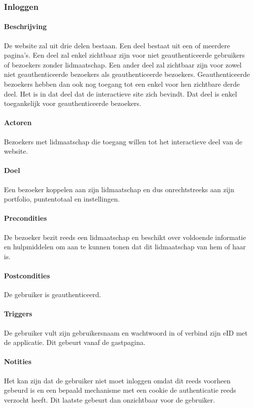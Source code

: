 \subsubsection{Inloggen}
\begin{compact}
\paragraph{Beschrijving} De website zal uit drie delen bestaan. Een deel bestaat uit een of meerdere pagina's. Een deel zal enkel zichtbaar zijn voor niet geauthenticeerde gebruikers of bezoekers zonder lidmaatschap. Een ander deel zal zichtbaar zijn voor zowel niet geauthenticeerde bezoekers als geauthenticeerde bezoekers. Geauthenticeerde bezoekers hebben dan ook nog toegang tot een enkel voor hen zichtbare derde deel. Het is in dat deel dat de interactieve site zich bevindt. Dat deel is enkel toegankelijk voor geauthenticeerde bezoekers.
\paragraph{Actoren} Bezoekers met lidmaatschap die toegang willen tot het interactieve deel van de website.
\paragraph{Doel} Een bezoeker koppelen aan zijn lidmaatschap en dus onrechtstreeks aan zijn portfolio, puntentotaal en instellingen.
\paragraph{Precondities} De bezoeker bezit reeds een lidmaatschap en beschikt over voldoende informatie en hulpmiddelen om aan te kunnen tonen dat dit lidmaatschap van hem of haar is.
\paragraph{Postcondities} De gebruiker is geauthenticeerd.
\paragraph{Triggers} De gebruiker vult zijn gebruikersnaam en wachtwoord in of verbind zijn eID met de applicatie. Dit gebeurt vanaf de gastpagina.
\paragraph{Notities} Het kan zijn dat de gebruiker niet moet inloggen omdat dit reeds voorheen gebeurd is en een bepaald mechanisme met een cookie de authenticatie reeds verzocht heeft. Dit laatste gebeurt dan onzichtbaar voor de gebruiker.

\end{compact}
